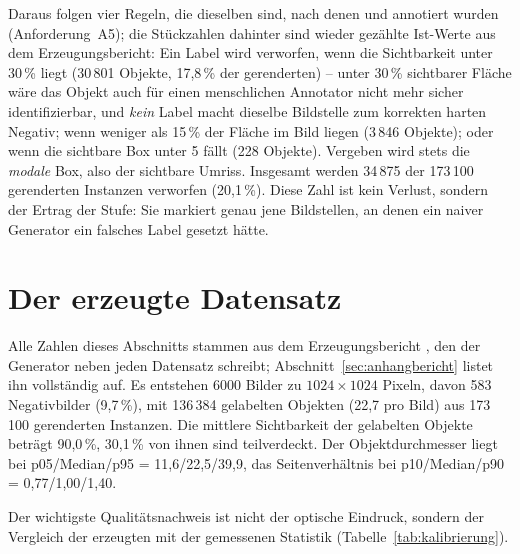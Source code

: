 Daraus folgen vier Regeln, die dieselben sind, nach denen  und
 annotiert wurden (Anforderung~A5); die Stückzahlen dahinter sind
wieder gezählte Ist-Werte aus dem Erzeugungsbericht: Ein Label wird verworfen, wenn die
Sichtbarkeit unter 30\,\% liegt (30\,801 Objekte, 17,8\,\% der gerenderten) --
unter 30\,\% sichtbarer Fläche wäre das Objekt auch für einen menschlichen
Annotator nicht mehr sicher identifizierbar, und \emph{kein} Label macht dieselbe
Bildstelle zum korrekten harten Negativ; wenn weniger als 15\,\% der Fläche im
Bild liegen (3\,846 Objekte); oder wenn die sichtbare Box unter 5\px{} fällt
(228 Objekte). Vergeben wird stets die \emph{modale} Box, also der sichtbare
Umriss. Insgesamt werden 34\,875 der 173\,100 gerenderten Instanzen verworfen
(20,1\,\%). Diese Zahl ist kein Verlust, sondern der Ertrag der Stufe: Sie
markiert genau jene Bildstellen, an denen ein naiver Generator ein falsches Label
gesetzt hätte.

\section{Der erzeugte Datensatz}
\label{sec:datensatz}

Alle Zahlen dieses Abschnitts stammen aus dem Erzeugungsbericht
, den der Generator neben jeden Datensatz
schreibt; Abschnitt~\ref{sec:anhangbericht} listet ihn vollständig auf.
Es entstehen 6000 Bilder zu $1024\times1024$ Pixeln, davon 583 Negativbilder
(9,7\,\%), mit 136\,384 gelabelten Objekten (22,7 pro Bild) aus 173\,100
gerenderten Instanzen. Die mittlere Sichtbarkeit der gelabelten Objekte beträgt
90,0\,\%, 30,1\,\% von ihnen sind teilverdeckt. Der Objektdurchmesser liegt bei
p05/Median/p95 = 11,6/22,5/39,9\px, das Seitenverhältnis bei
p10/Median/p90 = 0,77/1,00/1,40.

Der wichtigste Qualitätsnachweis ist nicht der optische Eindruck, sondern der
Vergleich der erzeugten mit der gemessenen Statistik
(Tabelle~\ref{tab:kalibrierung}).

